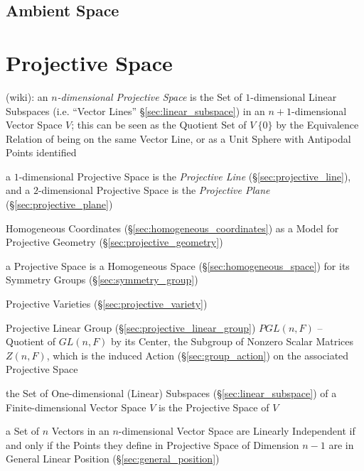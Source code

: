 \subsection{Ambient Space}\label{sec:ambient_space}




\section{Projective Space}\label{sec:projective_space}

(wiki):
an \emph{$n$-dimensional Projective Space} is the Set of $1$-dimensional Linear
Subspaces (i.e. ``Vector Lines'' \S\ref{sec:linear_subspace}) in an
$n+1$-dimensional Vector Space $V$; this can be seen as the Quotient Set of $V
\ \{0\}$ by the Equivalence Relation of being on the same Vector Line, or as a
Unit Sphere with Antipodal Points identified

a $1$-dimensional Projective Space is the \emph{Projective Line}
(\S\ref{sec:projective_line}), and a $2$-dimensional Projective Space is the
\emph{Projective Plane} (\S\ref{sec:projective_plane})

Homogeneous Coordinates (\S\ref{sec:homogeneous_coordinates}) as a Model for
Projective Geometry (\S\ref{sec:projective_geometry})

a Projective Space is a Homogeneous Space (\S\ref{sec:homogeneous_space}) for
its Symmetry Groups (\S\ref{sec:symmetry_group}) %

\fist Projective Varieties (\S\ref{sec:projective_variety})

Projective Linear Group (\S\ref{sec:projective_linear_group}) $PGL(n,F)$ --
Quotient of $GL(n,F)$ by its Center, the Subgroup of Nonzero Scalar Matrices
$Z(n,F)$, which is the induced Action (\S\ref{sec:group_action}) on the
associated Projective Space

the Set of One-dimensional (Linear) Subspaces (\S\ref{sec:linear_subspace}) of a
Finite-dimensional Vector Space $V$ is the Projective Space of $V$

a Set of $n$ Vectors in an $n$-dimensional Vector Space are Linearly
Independent if and only if the Points they define in Projective Space of
Dimension $n-1$ are in General Linear Position (\S\ref{sec:general_position})

